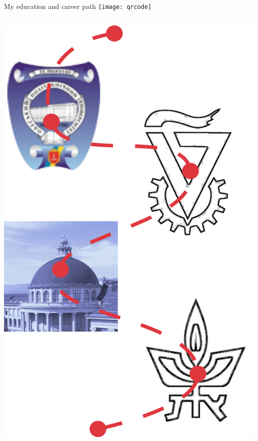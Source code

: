 \begin{frame}[label=intro-1]{My education and career path \hfill \texttt{[image: qrcode]}}
\begin{columns}
\begin{column}{.3\textwidth}
\includegraphics[height=.8\textheight]{fig/career/career_path.png}
\end{column}


\end{columns}
\end{frame}
